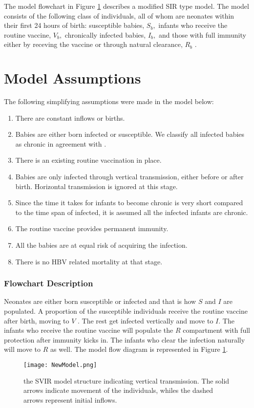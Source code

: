 The model flowchart in Figure \ref{fig:flowchart} describes a modified SIR type model. The model consists of the following class of individuals, all of whom are neonates within their first 24 hours of birth: susceptible babies, $S_b,$ infants who receive the routine vaccine, $V_b,$ chronically infected babies, $I_b, $  and those with full immunity either by receving the vaccine or through natural clearance, $R_b$ .

\section{Model Assumptions}
The following simplifying assumptions were made in the model below:
\begin{enumerate}
	\item There are constant inflows or births. 
	\item Babies are either born infected or susceptible. We classify all infected babies as chronic in agreement with \cite{zhang2012analysisHBVmodel}.
	\item There is an existing routine vaccination in place.
	\item Babies are only infected through vertical transmission, either before or after birth. Horizontal transmission is ignored at this stage.
	\item Since the time it takes for infants to become chronic is very short compared to the time span of infected, it is assumed all the infected infants are chronic.
	\item The routine vaccine provides permanent immunity.
	\item All the babies are at equal risk of acquiring the infection.
	\item There is no HBV related mortality at that stage.
	
\end{enumerate}

\subsubsection{Flowchart Description}
Neonates are either born susceptible or infected and that is how $S$ and $I$ are populated. A proportion of the susceptible individuals receive the routine vaccine after birth, moving to $V$ .  The rest get infected vertically and move to $I$. The infants who receive the routine vaccine will populate the $R$ compartment with full protection after immunity kicks in. The infants who clear the infection naturally will move to $R$ as well. 
\clearpage 		
The model flow diagram is represented in Figure \ref{fig:flowchart}. 
\begin{figure}[h!]
	\centering
	\texttt{[image: NewModel.png]}
	\caption{the SVIR model structure indicating vertical transmission. The solid arrows indicate movement of the individuals, whiles the dashed arrows represent initial inflows.} \label{fig:flowchart}
\end{figure}

